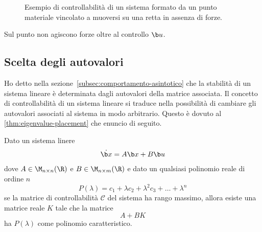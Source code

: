 \begin{example}
\begin{figure}[H]
        \caption[Punto materiale su una retta]{Esempio di controllabilità di
        un sistema formato da un punto materiale vincolato a muoversi su una retta
        in assenza di forze.}
    \end{figure}


    Sul punto non agiscono forze oltre al controllo $\b u$.
    \label{ex:controllabilità}
\end{example}

\subsection{Scelta degli autovalori}
\label{subsec:scelta-autovalori}
Ho detto nella sezione~\ref{subsec:comportamento-asintotico} che la stabilità
di un sistema lineare è determinata dagli autovalori della matrice associata.
Il concetto di controllabilità di un sistema lineare si traduce nella possibilità
di cambiare gli autovalori associati al sistema in modo arbitrario.
Questo è dovuto al \autoref{thm:eigenvalue-placement} che enuncio di seguito.

\begin{thm}

    Dato un sistema linere
    \begin{equation}
        \dot {\b x} = A\b x + B \b u
        \label{eq:sistema-lineare-controllabile}
    \end{equation}
    dove $A \in \M_{n\times n}(\R)$ e $B \in \M_{n\times m}(\R)$
    e dato un qualsiasi polinomio reale di ordine $n$
    \begin{equation*}
        P(\lambda) = c_1 + \lambda c_2 + \lambda^2 c_3 + \ldots + \lambda^n
    \end{equation*}
    se la matrice di controllabilità $\mathcal C$ del sistema ha rango massimo,
    allora esiste una matrice reale $K$ tale che la matrice
    \begin{equation*}
        A + BK
    \end{equation*}
    ha $P(\lambda)$ come polinomio caratteristico.

    \label{thm:eigenvalue-placement}
\end{thm}

